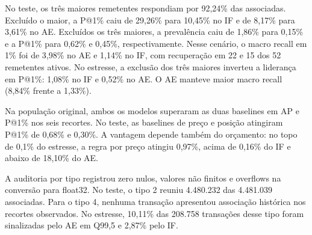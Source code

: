 No teste, os três maiores remetentes respondiam por 92,24\% das associadas. Excluído o maior, a P@1\% caiu de 29,26\% para 10,45\% no IF e de 8,17\% para 3,61\% no AE. Excluídos os três maiores, a prevalência caiu de 1,86\% para 0,15\% e a P@1\% para 0,62\% e 0,45\%, respectivamente. Nesse cenário, o macro recall em 1\% foi de 3,98\% no AE e 1,14\% no IF, com recuperação em 22 e 15 dos 52 remetentes ativos. No estresse, a exclusão dos três maiores inverteu a liderança em P@1\%: 1,08\% no IF e 0,52\% no AE. O AE manteve maior macro recall (8,84\% frente a 1,33\%).

Na população original, ambos os modelos superaram as duas baselines em AP e P@1\% nos seis recortes. No teste, as baselines de preço e posição atingiram P@1\% de 0,68\% e 0,30\%. A vantagem depende também do orçamento: no topo de 0,1\% do estresse, a regra por preço atingiu 0,97\%, acima de 0,16\% do IF e abaixo de 18,10\% do AE.

A auditoria por tipo registrou zero nulos, valores não finitos e overflows na conversão para float32. No teste, o tipo 2 reuniu 4.480.232 das 4.481.039 associadas. Para o tipo 4, nenhuma transação apresentou associação histórica nos recortes observados. No estresse, 10,11\% das 208.758 transações desse tipo foram sinalizadas pelo AE em Q99,5 e 2,87\% pelo IF.
